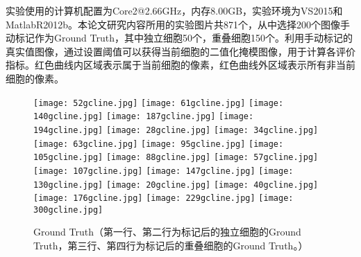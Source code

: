 \documentclass[nomlist,masters]{seuthesix}
\begin{document}
实验使用的计算机配置为Core2@2.66GHz，内存8.00GB，实验环境为VS2015和MatlabR2012b。本论文研究内容所用的实验图片共871个，从中选择200个图像手动标记作为Ground Truth，其中独立细胞50个，重叠细胞150个。利用手动标记的真实值图像，通过设置阈值可以获得当前细胞的二值化掩模图像，用于计算各评价指标。红色曲线内区域表示属于当前细胞的像素，红色曲线外区域表示所有非当前细胞的像素。
\begin{figure}[H]
\centering 
\texttt{[image: 52gcline.jpg]}
\hspace{0.001\textwidth}
\texttt{[image: 61gcline.jpg]}
\hspace{0.001\textwidth}
\texttt{[image: 140gcline.jpg]}
\hspace{0.001\textwidth}
\texttt{[image: 187gcline.jpg]}
\hspace{0.001\textwidth}
\texttt{[image: 194gcline.jpg]}
\vfill
\vspace{6pt}
\centering 
\texttt{[image: 28gcline.jpg]}
\hspace{0.001\textwidth}
\texttt{[image: 34gcline.jpg]}
\hspace{0.001\textwidth}
\texttt{[image: 63gcline.jpg]}
\hspace{0.001\textwidth}
\texttt{[image: 95gcline.jpg]}
\hspace{0.001\textwidth}
\texttt{[image: 105gcline.jpg]}
\vfill
\vspace{6pt}
\centering 
\texttt{[image: 88gcline.jpg]}%
\hspace{0.001\textwidth}
\texttt{[image: 57gcline.jpg]}
\hspace{0.001\textwidth}
\texttt{[image: 107gcline.jpg]}
\hspace{0.001\textwidth}
\texttt{[image: 147gcline.jpg]}
\hspace{0.001\textwidth}
\texttt{[image: 130gcline.jpg]}%
\vfill
\vspace{6pt}
\centering 
\texttt{[image: 20gcline.jpg]}
\hspace{0.001\textwidth}
\texttt{[image: 40gcline.jpg]}
\hspace{0.001\textwidth}
\texttt{[image: 176gcline.jpg]}
\hspace{0.001\textwidth}
\texttt{[image: 229gcline.jpg]}
\hspace{0.001\textwidth}
\texttt{[image: 300gcline.jpg]}
\caption{Ground Truth（第一行、第二行为标记后的独立细胞的Ground Truth，第三行、第四行为标记后的重叠细胞的Ground Truth。）}
\label{GT}
\end{figure}
\end{document}
